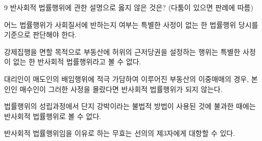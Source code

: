 \begin{question}{9}
반사회적 법률행위에 관한 설명으로 옳지 않은 것은? (다툼이 있으면 판례에 따름)
\begin{choices}
  \item 어느 법률행위가 사회질서에 반하는지 여부는 특별한 사정이 없는 한 법률행위 당시를 기준으로 판단해야 한다.
  \item 강제집행을 면할 목적으로 부동산에 허위의 근저당권을 설정하는 행위는 특별한 사정이 없는 한 반사회적 법률행위라고 볼 수 없다.
  \item 대리인이 매도인의 배임행위에 적극 가담하여 이루어진 부동산의 이중매매의 경우, 본인인 매수인이 그러한 사정을 몰랐다면 반사회적 법률행위가 되지 않는다.
  \item 법률행위의 성립과정에서 단지 강박이라는 불법적 방법이 사용된 것에 불과한 때에는 반사회적 법률행위로 볼 수 없다.
  \item 반사회적 법률행위임을 이유로 하는 무효는 선의의 제3자에게 대항할 수 있다.
\end{choices}
\end{question}
